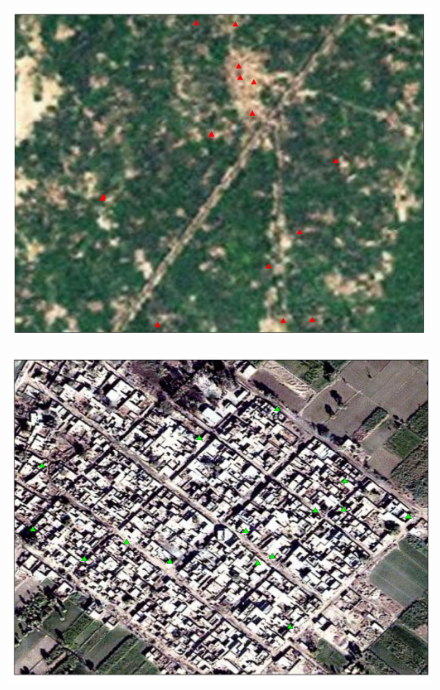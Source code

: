 \documentclass{beamer}
\begin{document}
\begin{frame}{}
	\begin{figure}[htb]
		\begin{center}
		\includegraphics[scale=0.4]{maps/disparate_farming.pdf}
		\end{center}
	\end{figure}
\end{frame}

\begin{frame}{}
	\begin{figure}[htb]
		\begin{center}
		\includegraphics[scale=0.4]{maps/concentrated.pdf}
		\end{center}
	\end{figure}
\end{frame}
\end{document}
